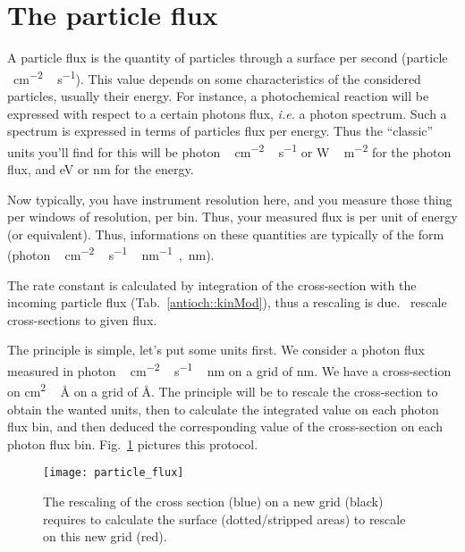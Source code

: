 \section{The particle flux}

A particle flux is the quantity of particles through
a surface per second (\unit{particle\,cm^{-2}\,s^{-1}}). This
value depends on some characteristics of the considered
particles, usually their energy. For instance, a photochemical
reaction will be expressed with respect to a certain photons
flux, \textit{i.e.} a photon spectrum. Such a spectrum is
expressed in terms of particles flux per energy. Thus the
``classic'' units you'll find for this will be
  \unit{photon\,cm^{-2}\,s^{-1}} or \unit{W\,m^{-2}} 
for the photon flux, and
  \unit{eV} or \unit{nm}
for the energy. 

Now typically, you have instrument resolution here, and you
measure those thing per windows of resolution, per bin. Thus,
your measured flux is per unit of energy (or equivalent). Thus,
informations on these quantities are typically of the form
(\unit{photon\,cm^{-2}\,s^{-1}\,nm^{-1}}~,~\unit{nm}).

The rate constant is calculated by integration of the
cross-section with the incoming particle flux 
(Tab.~\ref{antioch::kinMod}), thus a rescaling
is due. \Antioch\ rescale cross-sections to given
flux.

The principle is simple, let's put some units first. We
consider a photon flux measured in \unit{photon\,cm^{-2}\,s^{-1}\,nm}
on a grid of \unit{nm}. We have a cross-section on \unit{cm^2\,\AA}
on a grid of \unit{\AA}. The principle will be to rescale
the cross-section to obtain the wanted units, then to calculate
the integrated value on each photon flux bin, and then deduced
the corresponding value of the cross-section on each photon
flux bin. Fig.~\ref{dev:particle_flux_rescaling} pictures
this protocol.

\begin{figure}
\centering
\texttt{[image: particle\_flux]}
\caption{\label{dev:particle_flux_rescaling}The rescaling of the cross section (blue) on
a new grid (black) requires to calculate the surface (dotted/stripped areas) to rescale
on this new grid (red).}
\end{figure}
